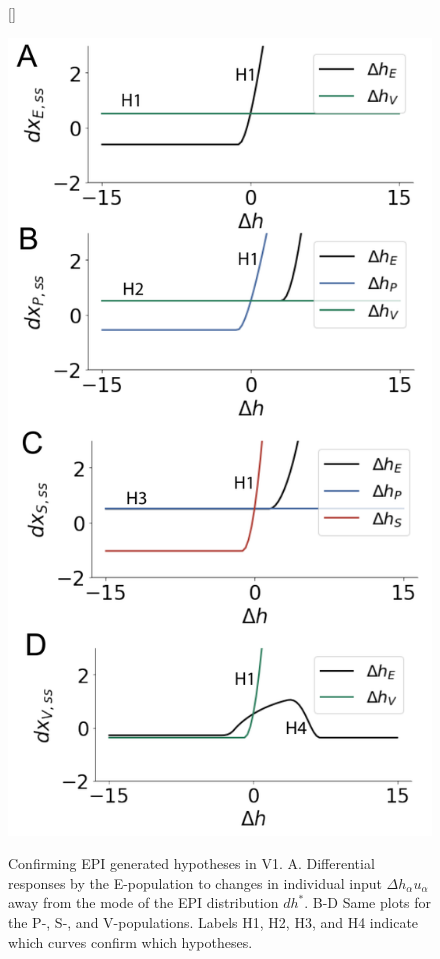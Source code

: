 \documentclass[11pt]{article}
\begin{document}
\begin{figure}
[\FBwidth]
{\caption{Confirming EPI generated hypotheses in V1. A. Differential responses by the E-population to changes in individual input $\Delta h_\alpha u_\alpha$ away from the mode of the EPI distribution $dh^*$. B-D Same plots for the P-, S-, and V-populations.  Labels H1, H2, H3, and H4 indicate which curves confirm which hypotheses.}}
{\includegraphics[scale=0.6]{figures/fig3/fig3.pdf}}
\end{figure}
\end{document}
